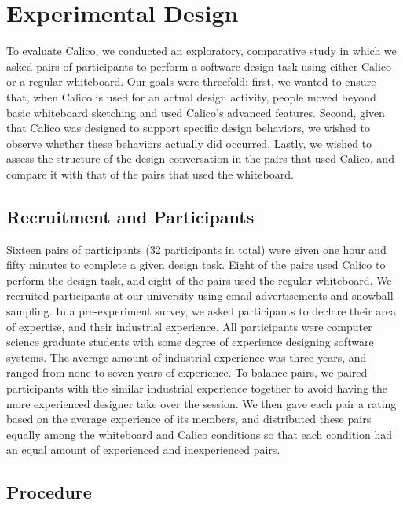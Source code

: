 \section{Experimental Design}
\label{experimentaldesign}
To evaluate Calico, we conducted an exploratory, comparative study in which we asked pairs of participants to perform a software design task using either Calico or a regular whiteboard. Our goals were threefold: first, we wanted to ensure that, when Calico is used for an actual design activity, people moved beyond basic whiteboard sketching and used Calico's advanced features. Second, given that Calico was designed to support specific design behaviors, we wished to observe whether these behaviors actually did occurred. Lastly, we wished to assess the structure of the design conversation in the pairs that used Calico, and compare it with that of the pairs that used the whiteboard.

\subsection {Recruitment and Participants}
\label{experimentaldesign:1}

Sixteen pairs of participants (32 participants in total) were given one hour and fifty minutes to complete a given design task. Eight of the pairs used Calico to perform the design task, and eight of the pairs used the regular whiteboard. 
We recruited participants at our university using email advertisements and snowball sampling. In a pre-experiment survey, we asked participants to declare their area of expertise, and their industrial experience. All participants were computer science graduate students with some degree of experience designing software systems. The average amount of industrial experience was three years, and ranged from none to seven years of experience. To balance pairs, we paired participants with the similar industrial experience together to avoid having the more experienced designer take over the session. We then gave each pair a rating based on the average experience of its members, and distributed these pairs equally among the whiteboard and Calico conditions so that each condition had an equal amount of experienced and inexperienced pairs.

\subsection {Procedure}
\label{experimentaldesign:2}

